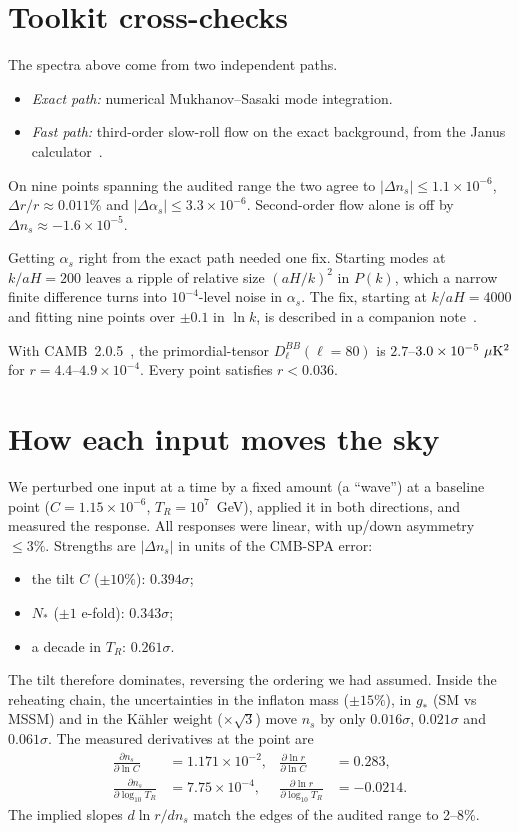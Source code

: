\documentclass[aps,prd,twocolumn,superscriptaddress,nofootinbib,showkeys]{revtex4-2}
\begin{document}
\section{Toolkit cross-checks}
The spectra above come from two independent paths.
\begin{itemize}
\item \emph{Exact path:} numerical Mukhanov--Sasaki mode integration.
\item \emph{Fast path:} third-order slow-roll flow on the exact background, from the Janus calculator~\cite{Janus}.
\end{itemize}
On nine points spanning the audited range the two agree to $|\Delta n_s|\le1.1\times10^{-6}$, $\Delta r/r\approx0.011\%$ and $|\Delta\alpha_s|\le3.3\times10^{-6}$. Second-order flow alone is off by $\Delta n_s\approx-1.6\times10^{-5}$.

Getting $\alpha_s$ right from the exact path needed one fix. Starting modes at $k/aH=200$ leaves a ripple of relative size $(aH/k)^2$ in $P(k)$, which a narrow finite difference turns into $10^{-4}$-level noise in $\alpha_s$. The fix, starting at $k/aH=4000$ and fitting nine points over $\pm0.1$ in $\ln k$, is described in a companion note~\cite{P6}.

With CAMB~2.0.5~\cite{CAMB}, the primordial-tensor $D_\ell^{BB}(\ell=80)$ is $2.7$--$3.0\times10^{-5}~\mu{\rm K}^2$ for $r=4.4$--$4.9\times10^{-4}$. Every point satisfies $r<0.036$.

\section{How each input moves the sky}
We perturbed one input at a time by a fixed amount (a ``wave'') at a baseline point ($C=1.15\times10^{-6}$, $T_R=10^7$~GeV), applied it in both directions, and measured the response. All responses were linear, with up/down asymmetry $\le3\%$. Strengths are $|\Delta n_s|$ in units of the CMB-SPA error:
\begin{itemize}
\item the tilt $C$ ($\pm10\%$): $0.394\sigma$;
\item $N_*$ ($\pm1$ e-fold): $0.343\sigma$;
\item a decade in $T_R$: $0.261\sigma$.
\end{itemize}
The tilt therefore dominates, reversing the ordering we had assumed. Inside the reheating chain, the uncertainties in the inflaton mass ($\pm15\%$), in $g_*$ (SM vs MSSM) and in the K\"ahler weight ($\times\sqrt3$) move $n_s$ by only $0.016\sigma$, $0.021\sigma$ and $0.061\sigma$. The measured derivatives at the point are
\begin{align}
\frac{\partial n_s}{\partial\ln C}&=1.171\times10^{-2}, & \frac{\partial\ln r}{\partial\ln C}&=0.283,\nonumber\\
\frac{\partial n_s}{\partial\log_{10}T_R}&=7.75\times10^{-4}, & \frac{\partial\ln r}{\partial\log_{10}T_R}&=-0.0214 .
\end{align}
The implied slopes $d\ln r/dn_s$ match the edges of the audited range to 2--8\%.
\end{document}
